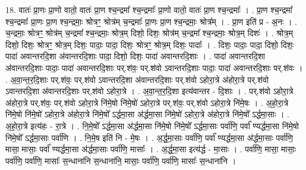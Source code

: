 \documentclass[17pt]{extarticle}
\begin{document}
18. वातः॑ प्रा॒णः प्रा॒णो वातो॒ वातः॑ प्रा॒ण श्च॒न्द्रमा᳚ श्च॒न्द्रमाः᳚ प्रा॒णो वातो॒ वातः॑ प्रा॒ण श्च॒न्द्रमाः᳚ । . प्रा॒ण श्च॒न्द्रमा᳚ श्च॒न्द्रमाः᳚ प्रा॒णः प्रा॒ण श्च॒न्द्रमाः॒ श्रोत्रꣳ॒॒ श्रोत्र॑म् च॒न्द्रमाः᳚ प्रा॒णः प्रा॒ण श्च॒न्द्रमाः॒ श्रोत्र᳚म् । . प्रा॒ण इति॑ प्र - अ॒नः । . च॒न्द्रमाः॒ श्रोत्रꣳ॒॒ श्रोत्र॑म् च॒न्द्रमा᳚ श्च॒न्द्रमाः॒ श्रोत्र॒म् दिशो॒ दिशः॒ श्रोत्र॑म् च॒न्द्रमा᳚ श्च॒न्द्रमाः॒ श्रोत्र॒म् दिशः॑ । . श्रोत्र॒म् दिशो॒ दिशः॒ श्रोत्रꣳ॒॒ श्रोत्र॒म् दिशः॒ पादाः॒ पादा॒ दिशः॒ श्रोत्रꣳ॒॒ श्रोत्र॒म् दिशः॒ पादाः᳚ । . दिशः॒ पादाः॒ पादा॒ दिशो॒ दिशः॒ पादा॑ अवान्तरदि॒शा अ॑वान्तरदि॒शाः पादा॒ दिशो॒ दिशः॒ पादा॑ अवान्तरदि॒शाः । . पादा॑ अवान्तरदि॒शा अ॑वान्तरदि॒शाः पादाः॒ पादा॑ अवान्तरदि॒शाः पर्.श॑वः॒ पर्.श॑वो ऽवान्तरदि॒शाः पादाः॒ पादा॑ अवान्तरदि॒शाः पर्.श॑वः । . अ॒वा॒न्त॒र॒दि॒शाः पर्.श॑वः॒ पर्.श॑वो ऽवान्तरदि॒शा अ॑वान्तरदि॒शाः पर्.श॑वो ऽहोरा॒त्रे अ॑होरा॒त्रे पर्.श॑वो ऽवान्तरदि॒शा अ॑वान्तरदि॒शाः पर्.श॑वो ऽहोरा॒त्रे । . अ॒वा॒न्त॒र॒दि॒शा इत्य॑वान्तर - दि॒शाः । . पर्.श॑वो ऽहोरा॒त्रे अ॑होरा॒त्रे पर्.श॑वः॒ पर्.श॑वो ऽहोरा॒त्रे नि॑मे॒षो नि॑मे॒षो॑ ऽहोरा॒त्रे पर्.श॑वः॒ पर्.श॑वो ऽहोरा॒त्रे नि॑मे॒षः । . अ॒हो॒रा॒त्रे नि॑मे॒षो नि॑मे॒षो॑ ऽहोरा॒त्रे अ॑होरा॒त्रे नि॑मे॒षो᳚ ऽर्द्धमा॒सा अ॑र्द्धमा॒सा नि॑मे॒षो॑ ऽहोरा॒त्रे अ॑होरा॒त्रे नि॑मे॒षो᳚ ऽर्द्धमा॒साः । . अ॒हो॒रा॒त्रे इत्य॑हः - रा॒त्रे । . नि॒मे॒षो᳚ ऽर्द्धमा॒सा अ॑र्द्धमा॒सा नि॑मे॒षो नि॑मे॒षो᳚ ऽर्द्धमा॒साः पर्वा॑णि॒ पर्वा᳚ ण्यर्द्धमा॒सा नि॑मे॒षो नि॑मे॒षो᳚ ऽर्द्धमा॒साः पर्वा॑णि । . नि॒मे॒ष इति॑ नि - मे॒षः । . अ॒र्द्ध॒मा॒साः पर्वा॑णि॒ पर्वा᳚ ण्यर्द्धमा॒सा अ॑र्द्धमा॒साः पर्वा॑णि॒ मासा॒ मासाः॒ पर्वा᳚ ण्यर्द्धमा॒सा अ॑र्द्धमा॒साः पर्वा॑णि॒ मासाः᳚ । . अ॒र्द्ध॒मा॒सा इत्य॑र्द्ध - मा॒साः । . पर्वा॑णि॒ मासा॒ मासाः॒ पर्वा॑णि॒ पर्वा॑णि॒ मासाः᳚ स॒न्धाना॑नि स॒न्धाना॑नि॒ मासाः॒ पर्वा॑णि॒ पर्वा॑णि॒ मासाः᳚ स॒न्धाना॑नि । \newline
\end{document}
